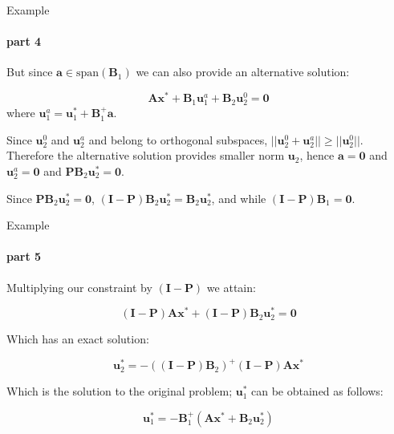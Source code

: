 \documentclass{beamer}
\begin{document}
\begin{frame}{Example}
\framesubtitle{part 4}
\begin{flushleft}

But since $\mathbf{a} \in \text{span}(\mathbf{B}_1)$ we can also provide an alternative solution:

\begin{equation}
    \mathbf{A} \mathbf{x}^* + \mathbf{B}_1 \mathbf{u}^a_1 + \mathbf{B}_2 \mathbf{u}^0_2 = \mathbf{0}
\end{equation}
%
where $\mathbf{u}^a_1 = \mathbf{u}^*_1 + \mathbf{B}^+_1 \mathbf{a}$.

\bigskip

Since $\mathbf{u}^0_2$ and $\mathbf{u}^a_2$ and belong to orthogonal subspaces, $||\mathbf{u}^0_2 + \mathbf{u}^a_2|| \geq ||\mathbf{u}^0_2||$. Therefore the alternative solution provides smaller norm $\mathbf{u}_2$, hence $\mathbf{a} = \mathbf{0}$ and $\mathbf{u}^a_2 = \mathbf{0}$ and $\mathbf{P} \mathbf{B}_2 \mathbf{u}^*_2 = \mathbf{0}$.

\bigskip

Since $\mathbf{P} \mathbf{B}_2 \mathbf{u}^*_2 = \mathbf{0}$, $(\mathbf{I} - \mathbf{P}) \mathbf{B}_2 \mathbf{u}^*_2 = \mathbf{B}_2\mathbf{u}^*_2$, and while $(\mathbf{I} - \mathbf{P}) \mathbf{B}_1 = \mathbf{0}$.


\end{flushleft}
\end{frame}




\begin{frame}{Example}
\framesubtitle{part 5}
\begin{flushleft}

 Multiplying our constraint by $(\mathbf{I} - \mathbf{P})$ we attain:

\begin{equation}
    (\mathbf{I} - \mathbf{P}) \mathbf{A} \mathbf{x}^* + (\mathbf{I} - \mathbf{P}) \mathbf{B}_2 \mathbf{u}^*_2 = \mathbf{0}
\end{equation}

Which has an exact solution:

\begin{equation}
\label{Solution_u2}
     \mathbf{u}^*_2 = -((\mathbf{I} - \mathbf{P}) \mathbf{B}_2)^+(\mathbf{I} - \mathbf{P}) \mathbf{A} \mathbf{x}^*
\end{equation}

Which is the solution to the original problem; $\mathbf{u}^*_1$ can be obtained as follows:

\begin{equation}
\label{Solution_u1}
      \mathbf{u}^*_1  = -\mathbf{B}^+_1(\mathbf{A} \mathbf{x}^* + \mathbf{B}_2 \mathbf{u}^*_2)
\end{equation}


\end{flushleft}
\end{frame}
\end{document}
